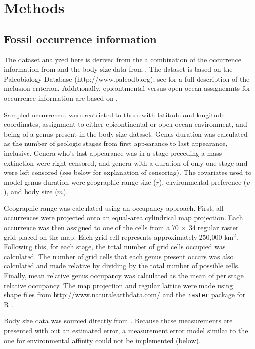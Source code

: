 \documentclass[12pt,letterpaper]{article}
\begin{document}
\section{Methods}

\subsection{Fossil occurrence information}

The dataset analyzed here is derived from the a combination of the occurrence information from \citet{Foote2013} and the body size data from \citet{Payne2014}. The \citet{Foote2013} dataset is based on the Paleobiology Database (http://www.paleodb.org); see \citet{Foote2013} for a full description of the inclusion criterion. Additionally, epicontinental versus open ocean assignemnts for occurrence information are based on \citet{Miller2009a}.

Sampled occurrences were restricted to those with latitude and longitude coordinates, assignment to either epicontinental or open-ocean environment, and being of a genus present in the body size dataset. Genus duration was calculated as the number of geologic stages from first appearance to last appearance, inclusive. Genera who's last appearance was in a stage preceding a mass extinction were right censored, and genera with a duration of only one stage and were left censored (see below for explanation of censoring). The covariates used to model genus duration were geographic range size (\(r\)), environmental preference (\(v\)), and body size (\(m\)). 

Geographic range was calculated using an occupancy approach. First, all occurrences were projected onto an equal-area cylindrical map projection. Each occurrence was then assigned to one of the cells from a 70 \(\times\) 34 regular raster grid placed on the map. Each grid cell represents approximately 250,000 km\(^{2}\). Following this, for each stage, the total number of grid cells occupied was calculated. The number of grid cells that each genus present occurs was also calculated and made relative by dividing by the total number of possible cells. Finally, mean relative genus occupancy was calculated as the mean of per stage relative occupancy. The map projection and regular lattice were made using shape files from http://www.naturalearthdata.com/ and the \texttt{raster} package for R \citep{raster}.

Body size data was sourced directly from \citet{Payne2014}. Because those measurements are presented with out an estimated error, a measurement error model similar to the one for environmental affinity could not be implemented (below).
\end{document}
